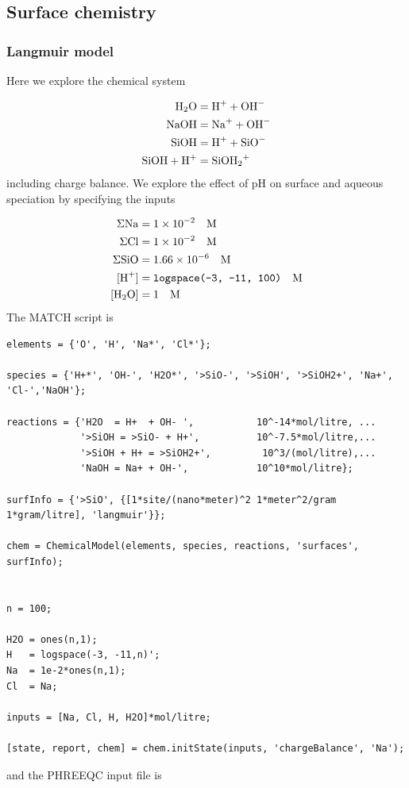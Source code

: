 \documentclass{article}
\begin{document}
\subsection{Surface chemistry}

\subsubsection{Langmuir model}
Here we explore the chemical system

\begin{align}
    \ce{H2O} &= \ce{H+} + \ce{OH-}\\
    \ce{NaOH}&= \ce{Na+} + \ce{OH-}\\
    \ce{SiOH} &= \ce{H+} + \ce{SiO-}\\
    \ce{SiOH} + \ce{H+} &= \ce{SiOH2+}
\end{align}
including charge balance. We explore the effect of pH on surface and aqueous speciation by specifying the inputs

\begin{align}
\Sigma \ce{Na} &= 1\times10^{-2} \quad\text{M}\\
\Sigma \ce{Cl} &= 1\times10^{-2} \quad\text{M}\\
\Sigma \ce{SiO} &= 1.66\times10^{-6} \quad\text{M}\\
[\ce{H+}] &= \texttt{logspace(-3, -11, 100)} \quad\text{M}\\
[\ce{H2O}] & = 1 \quad\text{M}
\end{align}
The MATCH script is

\begin{lstlisting}
elements = {'O', 'H', 'Na*', 'Cl*'};

species = {'H+*', 'OH-', 'H2O*', '>SiO-', '>SiOH', '>SiOH2+', 'Na+', 'Cl-','NaOH'};

reactions = {'H2O  = H+  + OH- ',           10^-14*mol/litre, ...
             '>SiOH = >SiO- + H+',          10^-7.5*mol/litre,...
             '>SiOH + H+ = >SiOH2+',         10^3/(mol/litre),...
             'NaOH = Na+ + OH-',            10^10*mol/litre};

surfInfo = {'>SiO', {[1*site/(nano*meter)^2 1*meter^2/gram 1*gram/litre], 'langmuir'}};

chem = ChemicalModel(elements, species, reactions, 'surfaces', surfInfo);


n = 100;

H2O = ones(n,1);
H   = logspace(-3, -11,n)';
Na  = 1e-2*ones(n,1);
Cl  = Na;

inputs = [Na, Cl, H, H2O]*mol/litre;

[state, report, chem] = chem.initState(inputs, 'chargeBalance', 'Na');
\end{lstlisting}
and the PHREEQC input file is
\end{document}
